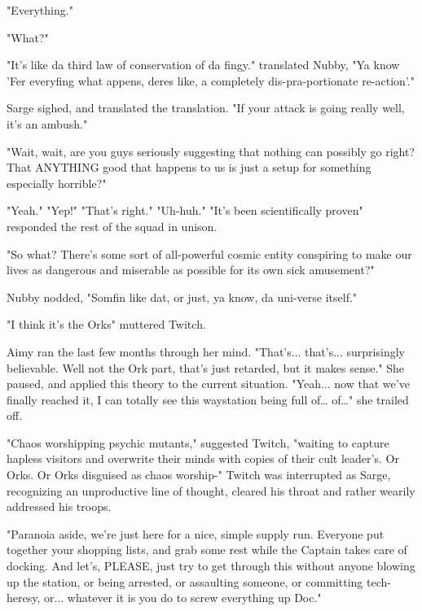 "Everything."

"What?"

"It's like da third law of conservation of da fingy." translated Nubby, "Ya know 'Fer everyfing what appens, deres like, a completely dis-pra-portionate re-action'."

Sarge sighed, and translated the translation. 
"If your attack is going really well, it's an ambush."

"Wait, wait, are you guys seriously suggesting that nothing can possibly go right? 
That ANYTHING good that happens to us is just a setup for something especially horrible?"

"Yeah." "Yep!" "That's right." "Uh-huh." "It's been scientifically proven" responded the rest of the squad in unison.

"So what? 
There's some sort of all-powerful cosmic entity conspiring to make our lives as dangerous and miserable as possible for its own sick amusement?"

Nubby nodded, "Somfin like dat, or just, ya know, da uni-verse itself."

"I think it's the Orks" muttered Twitch.

Aimy ran the last few months through her mind. 
"That's... 
that's... 
surprisingly believable. 
Well not the Ork part, that's just retarded, but it makes sense." She paused, and applied this theory to the current situation. 
"Yeah... 
now that we've finally reached it, I can totally see this waystation being full of… of…" she trailed off.

"Chaos worshipping psychic mutants," suggested Twitch, "waiting to capture hapless visitors and overwrite their minds with copies of their cult leader's. 
Or Orks. 
Or Orks disguised as chaos worship-" Twitch was interrupted as Sarge, recognizing an unproductive line of thought, cleared his throat and rather wearily addressed his troops.

"Paranoia aside, we're just here for a nice, simple supply run. 
Everyone put together your shopping lists, and grab some rest while the Captain takes care of docking. 
And let's, PLEASE, just try to get through this without anyone blowing up the station, or being arrested, or assaulting someone, or committing tech-heresy, or... 
whatever it is you do to screw everything up Doc."